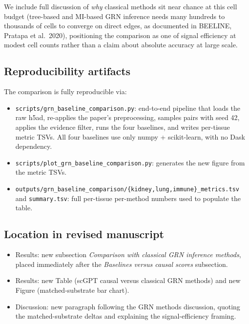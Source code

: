\documentclass[11pt,letterpaper]{article}
\begin{document}
We include full discussion of \emph{why} classical methods sit near chance
at this cell budget (tree-based and MI-based GRN inference needs many
hundreds to thousands of cells to converge on direct edges, as documented
in BEELINE, Pratapa et al.\ 2020), positioning the comparison as one of
signal efficiency at modest cell counts rather than a claim about
absolute accuracy at large scale.

\subsection*{Reproducibility artifacts}

The comparison is fully reproducible via:
\begin{itemize}[leftmargin=2em]
\item \texttt{scripts/grn\_baseline\_comparison.py}: end-to-end pipeline
  that loads the raw h5ad, re-applies the paper's preprocessing, samples
  pairs with seed 42, applies the evidence filter, runs the four
  baselines, and writes per-tissue metric TSVs. All four baselines use
  only numpy + scikit-learn, with no Dask dependency.
\item \texttt{scripts/plot\_grn\_baseline\_comparison.py}: generates the
  new figure from the metric TSVs.
\item \texttt{outputs/grn\_baseline\_comparison/\{kidney,lung,immune\}\_metrics.tsv}
  and \texttt{summary.tsv}: full per-tissue per-method numbers used to
  populate the table.
\end{itemize}

\subsection*{Location in revised manuscript}

\begin{itemize}[leftmargin=2em]
\item Results: new subsection \textit{Comparison with classical GRN
  inference methods}, placed immediately after the \textit{Baselines
  versus causal scores} subsection.
\item Results: new Table (scGPT causal versus classical GRN methods) and
  new Figure (matched-substrate bar chart).
\item Discussion: new paragraph following the GRN methods discussion,
  quoting the matched-substrate deltas and explaining the signal-efficiency
  framing.
\end{itemize}
\end{document}
